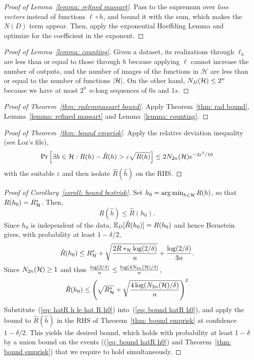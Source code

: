 \documentclass[reqno]{amsart}
\begin{document}
\begin{proof}[Proof of Lemma~\ref{lemma: refined massart}]
  Pass to the supremum over {\it loss vectors\/} instead of functions $\ell\circ h$, and bound it with the sum, which makes the $N(D)$ term appear. Then, apply the exponential Hoeffding Lemma and optimize for the coefficient in the exponent. 
\end{proof}

\begin{proof}[Proof of Lemma~\ref{lemma: counting}]
  Given a dataset, its realizations through $\ell_h$ are less than or equal to those through $h$ because applying $\ell$ cannot increase the number of outputs, and the number of images of the functions in $\mathcal H$ are less than or equal to the number of functions $\vert\mathcal{H}\vert$. On the other hand, $N_D(\mathcal{H})\le 2^n$ because we have at most $2^n$ $n$-long sequences of $0s$ and $1s$.
\end{proof}

\begin{proof}[Proof of Theorem~\ref{thm: rademmassart bound}]
  Apply Theorem~\ref{thm: rad bound}, Lemma~\ref{lemma: refined massart} and Lemma~\ref{lemma: counting}. 
\end{proof}

\begin{proof}[Proof of Theorem~\ref{thm: bound emprisk}]
        Apply the relative deviation inequality (see Loz's file),
        \[
        \Pr\left[\exists h\in\mathcal{H} : R(h)-\hat R(h) > \varepsilon \sqrt{R(h)}\right] \le 2N_{2n} (\mathcal{H}) e^{-2\varepsilon^2/16}
        \]
        with the suitable $\varepsilon$ and then isolate $\hat R(\hat h)$ on the RHS.
\end{proof}

\begin{proof}[Proof of Corollary~\ref{coroll: bound bestrisk}]
         Set $h_0 = \operatorname*{arg\,min}_{h\in\mathcal{H}} R(h)$, so that $R(h_0) = R^*_{\mathcal{H}}$. Then,
        \begin{equation}\label{eq: hatR h le hat R h0}
        \hat R(\hat h) \le \hat R(h_0).
        \end{equation}
        Since $h_0$ is independent of the data, $\mathbb{E}_D[\hat R(h_0)] = R(h_0)$ and hence Bernstein gives, with probability at least $1-\delta/2$,
        \[
        \hat R(h_0) \le R^*_{\mathcal{H}} + \sqrt{\frac{2R*_{\mathcal{H}} \log (2/\delta)}{n}} + \frac{\log(2/\delta)}{3n}.
        \]
        Since $N_{2n}(\mathcal{H})\ge 1$ and thus $\frac{\log (2/\delta)}{n}\le \frac{\log(4N_{2n}(\mathcal{H})/\delta)}{n}$,
        \begin{equation}\label{eq: bound hatR h0}
        \hat R(h_0) \le \left(\sqrt{R^*_{\mathcal{H}}} + \sqrt{\frac{4\log(N_{2n}(\mathcal{H})/\delta)}{n}}\right)^2
        \end{equation}
        Substitute~(\ref{eq: hatR h le hat R h0}) into~(\ref{eq: bound hatR h0}), and apply the bound to $\hat R(\hat h)$ in the RHS of Theorem~\ref{thm: bound emprisk} at confidence $1-\delta/2$. This yields the desired bound, which holds with probability at least $1-\delta$ by a union bound on the events ((\ref{eq: bound hatR h0}) and Theorem~\ref{thm: bound emprisk}) that we require to hold simultaneously.
\end{proof}
\end{document}

